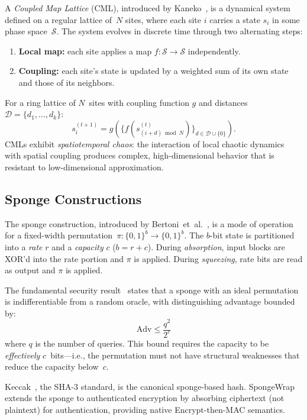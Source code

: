 \documentclass[runningheads]{llncs}
\begin{document}
A \emph{Coupled Map Lattice} (CML), introduced by Kaneko~\cite{kaneko1984cml,kaneko1985cml},
is a dynamical system defined on a regular lattice of~$N$ sites,
where each site $i$ carries a state $s_i$ in some phase space~$\mathcal{S}$.
The system evolves in discrete time through two alternating steps:
\begin{enumerate}[nosep]
\item \textbf{Local map:} each site applies a map $f: \mathcal{S} \to \mathcal{S}$
  independently.
\item \textbf{Coupling:} each site's state is updated by a weighted sum of its
  own state and those of its neighbors.
\end{enumerate}
For a ring lattice of $N$~sites with coupling function $g$ and distances
$\mathcal{D} = \{d_1, \ldots, d_k\}$:
\[
  s_i^{(t+1)} = g\!\left(\{f(s_{(i+d) \bmod N}^{(t)})\}_{d \in \mathcal{D} \cup \{0\}}\right).
\]
CMLs exhibit \emph{spatiotemporal chaos}: the interaction of local chaotic dynamics
with spatial coupling produces complex, high-dimensional behavior that is
resistant to low-dimensional approximation.

\subsection{Sponge Constructions}

The sponge construction, introduced by Bertoni~et~al.~\cite{bertoni2007sponge},
is a mode of operation for a fixed-width permutation~$\pi: \{0,1\}^b \to \{0,1\}^b$.
The $b$-bit state is partitioned into a \emph{rate} $r$ and a \emph{capacity} $c$
($b = r + c$).  During \emph{absorption}, input blocks are XOR'd into the rate
portion and $\pi$ is applied.  During \emph{squeezing}, rate bits are read as
output and $\pi$ is applied.

The fundamental security result~\cite{bertoni2008indifferentiability} states that
a sponge with an ideal permutation is indifferentiable from a random oracle,
with distinguishing advantage bounded by:
\[
  \mathrm{Adv} \leq \frac{q^2}{2^c}
\]
where $q$ is the number of queries.  This bound requires the capacity to be
\emph{effectively} $c$~bits---i.e., the permutation must not have structural
weaknesses that reduce the capacity below~$c$.

Keccak~\cite{keccak2011}, the SHA-3 standard, is the canonical sponge-based hash.
SpongeWrap extends the sponge to authenticated encryption by absorbing ciphertext
(not plaintext) for authentication, providing native Encrypt-then-MAC semantics.
\end{document}
